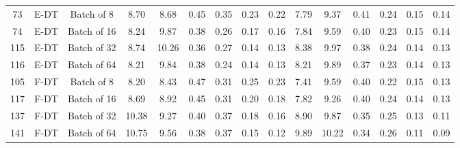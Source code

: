 \begin{table}
\begin{tabular}{@{\hskip3pt}c@{\hskip3pt}c@{\hskip3pt}c@{\hskip3pt}c@{\hskip3pt}c@{\hskip3pt}c@{\hskip3pt}c@{\hskip3pt}c@{\hskip3pt}c@{\hskip3pt}c@{\hskip3pt}c@{\hskip3pt}c@{\hskip3pt}c@{\hskip3pt}c@{\hskip3pt}c}
         73 &           E-DT &                Batch of 8 &              8.70 &        8.68 &          0.45 &        0.35 &        0.23 &         0.22 &                7.79 &        9.37 &          0.41 &        0.24 &        0.15 &         0.14 \\
         74 &           E-DT &               Batch of 16 &              8.24 &        9.87 &          0.38 &        0.26 &        0.17 &         0.16 &                7.84 &        9.59 &          0.40 &        0.23 &        0.15 &         0.14 \\
        115 &           E-DT &               Batch of 32 &              8.74 &       10.26 &          0.36 &        0.27 &        0.14 &         0.13 &                8.38 &        9.97 &          0.38 &        0.24 &        0.14 &         0.13 \\
        116 &           E-DT &               Batch of 64 &              8.21 &        9.84 &          0.38 &        0.24 &        0.14 &         0.13 &                8.21 &        9.89 &          0.37 &        0.23 &        0.14 &         0.13 \\
        105 &           F-DT &                Batch of 8 &              8.20 &        8.43 &          0.47 &        0.31 &        0.25 &         0.23 &                7.41 &        9.59 &          0.40 &        0.22 &        0.15 &         0.13 \\
        117 &           F-DT &               Batch of 16 &              8.69 &        8.92 &          0.45 &        0.31 &        0.20 &         0.18 &                7.82 &        9.26 &          0.40 &        0.24 &        0.14 &         0.13 \\
        137 &           F-DT &               Batch of 32 &             10.38 &        9.27 &          0.40 &        0.37 &        0.18 &         0.16 &                8.90 &        9.87 &          0.35 &        0.25 &        0.13 &         0.11 \\
        141 &           F-DT &               Batch of 64 &             10.75 &        9.56 &          0.38 &        0.37 &        0.15 &         0.12 &                9.89 &       10.22 &          0.34 &        0.26 &        0.11 &         0.09 \\
\bottomrule
\end{tabular}
\end{table}
